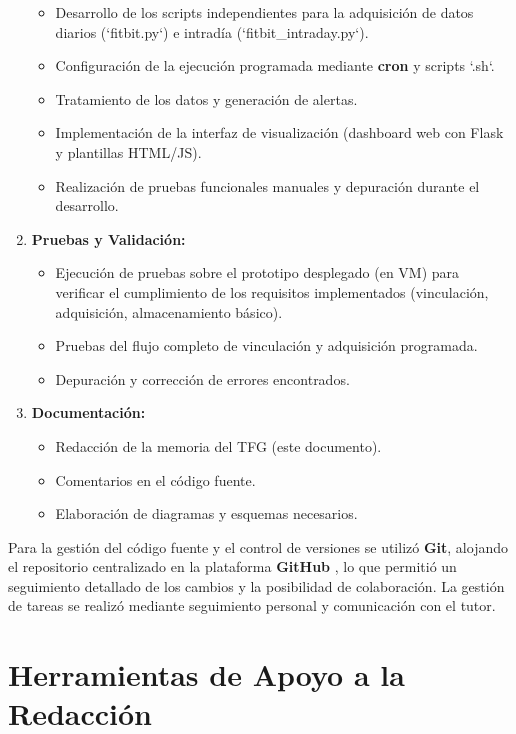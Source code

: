 \begin{enumerate}
\begin{itemize}
            \item Desarrollo de los scripts independientes para la adquisición de datos diarios (`fitbit.py`) e intradía (`fitbit\_intraday.py`).
            \item Configuración de la ejecución programada mediante \textbf{cron} y scripts `.sh`.
            \item Tratamiento de los datos y generación de alertas.
            \item Implementación de la interfaz de visualización (dashboard web con Flask y plantillas HTML/JS).
            \item Realización de pruebas funcionales manuales y depuración durante el desarrollo.
        \end{itemize}
    \item \textbf{Pruebas y Validación:}
        \begin{itemize}
            \item Ejecución de pruebas sobre el prototipo desplegado (en VM) para verificar el cumplimiento de los requisitos implementados (vinculación, adquisición, almacenamiento básico).
            \item Pruebas del flujo completo de vinculación y adquisición programada.
            \item Depuración y corrección de errores encontrados.
        \end{itemize}
    \item \textbf{Documentación:}
        \begin{itemize}
            \item Redacción de la memoria del TFG (este documento).
            \item Comentarios en el código fuente.
            \item Elaboración de diagramas y esquemas necesarios.
        \end{itemize}
\end{enumerate}

Para la gestión del código fuente y el control de versiones se utilizó \textbf{Git}, alojando el repositorio centralizado en la plataforma \textbf{GitHub} \cite{github_repo_proyecto}, lo que permitió un seguimiento detallado de los cambios y la posibilidad de colaboración. La gestión de tareas se realizó mediante seguimiento personal y comunicación con el tutor.

\section{Herramientas de Apoyo a la Redacción}
\label{sec:apoyo_redaccion}


